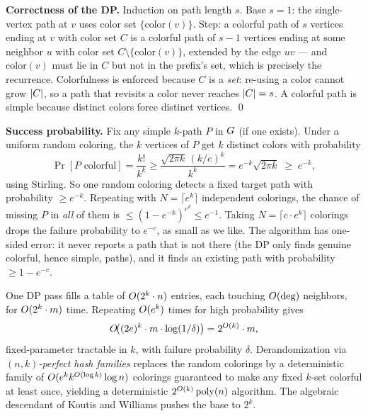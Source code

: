 \begin{whybox}
\textbf{Correctness of the DP.} Induction on path length $s$. Base $s=1$: the single-vertex path at $v$ uses color set $\{\mathrm{color}(v)\}$. Step: a colorful path of $s$ vertices ending at $v$ with color set $C$ is a colorful path of $s-1$ vertices ending at some neighbor $u$ with color set $C\setminus\{\mathrm{color}(v)\}$, extended by the edge $uv$ --- and $\mathrm{color}(v)$ must lie in $C$ but not in the prefix's set, which is precisely the recurrence. Colorfulness is enforced because $C$ is a \emph{set}: re-using a color cannot grow $\lvert C\rvert$, so a path that revisits a color never reaches $\lvert C\rvert=s$. A colorful path is simple because distinct colors force distinct vertices. \qed
\end{whybox}

\begin{whybox}
\textbf{Success probability.} Fix any simple $k$-path $P$ in $G$ (if one exists). Under a uniform random coloring, the $k$ vertices of $P$ get $k$ distinct colors with probability
\[
  \Pr[P\text{ colorful}] = \frac{k!}{k^k} \ge \frac{\sqrt{2\pi k}\,(k/e)^k}{k^k} = e^{-k}\sqrt{2\pi k}\;\ge\; e^{-k},
\]
using Stirling. So one random coloring detects a fixed target path with probability $\ge e^{-k}$. Repeating with $N = \lceil e^k\rceil$ independent colorings, the chance of missing $P$ in \emph{all} of them is $\le (1-e^{-k})^{e^k}\le e^{-1}$. Taking $N = \lceil c\cdot e^k\rceil$ colorings drops the failure probability to $e^{-c}$, as small as we like. The algorithm has one-sided error: it never reports a path that is not there (the DP only finds genuine colorful, hence simple, paths), and it finds an existing path with probability $\ge 1-e^{-c}$.
\end{whybox}

\begin{complexitybox}
One DP pass fills a table of $O(2^k\cdot n)$ entries, each touching $O(\deg)$ neighbors, for $O(2^k\cdot m)$ time. Repeating $O(e^k)$ times for high probability gives
\[
  O\!\big((2e)^k\cdot m\cdot \log(1/\delta)\big) = 2^{O(k)}\cdot m,
\]
fixed-parameter tractable in $k$, with failure probability $\delta$. Derandomization via \emph{$(n,k)$-perfect hash families} replaces the random colorings by a deterministic family of $O(e^k k^{O(\log k)}\log n)$ colorings guaranteed to make any fixed $k$-set colorful at least once, yielding a deterministic $2^{O(k)}\operatorname{poly}(n)$ algorithm. The algebraic descendant of Koutis and Williams pushes the base to $2^k$.
\end{complexitybox}

